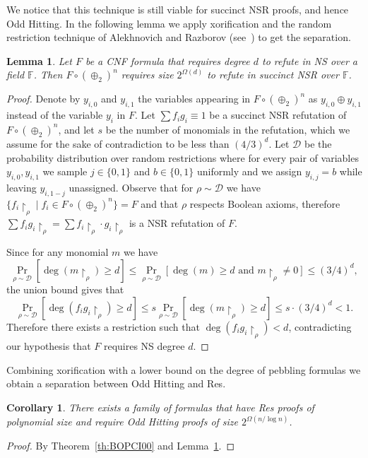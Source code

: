 \documentclass[11pt]{article}
\newcommand{\scterm}[1]{{\textrm{\sc #1}}}
\newcommand{\hit}{\scterm{Hitting}}
\newcommand{\res}{\scterm{Res}}
\newcommand{\ns}{\scterm{NS}}
\newcommand{\nsr}{\scterm{NSR}}
\newcommand{\hitodd}{\scterm{Odd} {\hit}}
\newcommand{\set}[1]{\{#1\}}
\newcommand{\restrict}[2]{{#1}{\upharpoonright_{#2}}}
\numberwithin{equation}{section}
\newtheorem{lemma}[theorem]{Lemma}
\newtheorem{corollary}[theorem]{Corollary}
\begin{document}
We notice that this technique is still viable for succinct {\nsr} proofs, and hence {\hitodd}.
In the following lemma we apply xorification and the random restriction technique of Alekhnovich and Razborov (see~\cite{Ben02}) to get the separation.

\begin{lemma}\label{lem:xorification}
  Let $F$ be a CNF formula that requires degree $d$ to refute in {\ns} over a field $\mathbb{F}$. Then $F \circ (\oplus_2)^n$ requires size $2^{\Omega(d)}$ to refute in succinct {\nsr} over $\mathbb{F}$.
\end{lemma}

\begin{proof}
  Denote by $y_{i,0}$ and $y_{i,1}$ the variables appearing in $F \circ (\oplus_2)^n$ as $y_{i,0}\oplus y_{i,1}$ instead of the variable $y_i$ in $F$.
  Let $\sum f_ig_i \equiv 1$ be a succinct {\nsr} refutation of $F \circ (\oplus_2)^n$, and let $s$ be the number of monomials in the refutation, which we assume for the sake of contradiction to be less than $(4/3)^d$.
  Let $\mathcal{D}$ be the probability distribution over random restrictions where for every pair of variables $y_{i,0},y_{i,1}$ we sample $j\in\set{0,1}$ and $b\in\set{0,1}$ uniformly and we assign $y_{i,j}=b$ while leaving $y_{i,1-j}$ unassigned.
  Observe that for $\rho\sim\mathcal{D}$ we have $\set{\restrict{f_i}{\rho}\mid f_i\in F\circ(\oplus_2)^n}=F$ and that $\rho$ respects Boolean axioms, therefore $\sum \restrict{f_ig_i}{\rho} = \sum \restrict{f_i}{\rho}\cdot\restrict{g_i}{\rho}$ is a {\nsr} refutation of $F$.

  Since for any monomial $m$ we have
  \[
    \Pr_{\rho\sim\mathcal{D}}[\deg(\restrict{m}{\rho}) \geq d] \leq
    \Pr_{\rho\sim\mathcal{D}}[\deg(m) \geq d \text{ and } \restrict{m}{\rho} \neq 0] \leq (3/4)^d,
  \]
  the union bound gives that
  \[
    \Pr_{\rho\sim\mathcal{D}}[\deg(\restrict{f_ig_i}{\rho}) \geq d] \leq
    s \Pr_{\rho\sim\mathcal{D}}[\deg(\restrict{m}{\rho}) \geq d] \leq
    s \cdot(3/4)^d < 1.
  \]
  Therefore there exists a restriction such that $\deg(\restrict{f_ig_i}{\rho}) < d$, contradicting our hypothesis that $F$ requires {\ns} degree $d$.
\end{proof}

Combining xorification with a lower bound on the degree of pebbling formulas we obtain a separation between {\hitodd} and {\res}.



\begin{corollary}
  \label{cor:pebbling-ns}
  There exists a family of formulas that have {\res} proofs of polynomial size and require {\hitodd} proofs of size $2^{\Omega(n/\log n)}$.
\end{corollary}
\begin{proof} By Theorem~\ref{th:BOPCI00} and Lemma~\ref{lem:xorification}.\end{proof}
\end{document}
